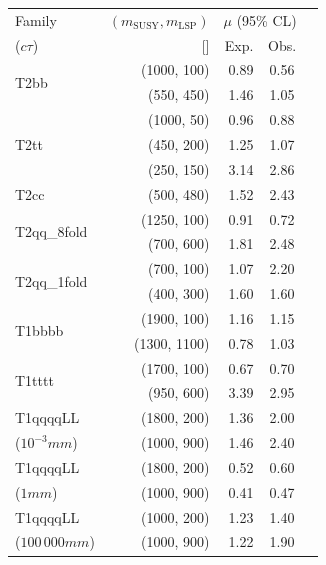 \clearpage
\begin{table}
  \label{tab:benchmarks_aux}
  \centering
    \begin{tabular}{ lrrcc }
      \hline
      Family
      & $(m_{\text{SUSY}}, m_{\mathrm{LSP}})$
      & \multicolumn{2}{c}{$\mu$ (95\% CL)}                                                                            \\ [0.3ex]
      ($c\tau$)
      & [\GeVns{}]
      & Exp.
      & Obs.                                                                                                           \\ [0.3ex]
      \hline
      \multirow{2}{*}{T2bb} & (1000, 100) & 0.89 & 0.56 \\ & (550, 450)  & 1.46 & 1.05 \\ [0.5ex]
      \multirow{3}{*}{T2tt} & (1000, 50)  & 0.96 & 0.88 \\ & (450, 200)  & 1.25 & 1.07 \\ & (250, 150)  & 3.14 & 2.86 \\ [0.5ex]
      \multirow{1}{*}{T2cc} & (500, 480)  & 1.52 & 2.43 \\ [0.5ex]
      \multirow{2}{*}{T2qq\_8fold} & (1250, 100) & 0.91 & 0.72 \\ & (700, 600)  & 1.81 & 2.48 \\ [0.5ex]
      \multirow{2}{*}{T2qq\_1fold} & (700, 100)  & 1.07 & 2.20 \\ & (400, 300)  & 1.60 & 1.60 \\ [0.5ex]
      \multirow{2}{*}{T1bbbb} & (1900, 100) & 1.16 & 1.15 \\ & (1300, 1100) & 0.78 & 1.03 \\ [0.5ex]
      \multirow{2}{*}{T1tttt} & (1700, 100) & 0.67 & 0.70 \\ & (950, 600)  & 3.39 & 2.95 \\ [0.5ex]
      T1qqqqLL & (1800, 200) & 1.36 & 2.00 \\ ($10^{-3}\unit{mm}$) & (1000, 900) & 1.46 & 2.40 \\ [0.5ex]
      T1qqqqLL & (1800, 200) & 0.52 & 0.60 \\ ($1\unit{mm}$) & (1000, 900) & 0.41 & 0.47 \\ [0.5ex]
      T1qqqqLL & (1000, 200) & 1.23 & 1.40 \\ ($100\,000\unit{mm}$) & (1000, 900) & 1.22 & 1.90 \\
      \hline
    \end{tabular}
\end{table}

